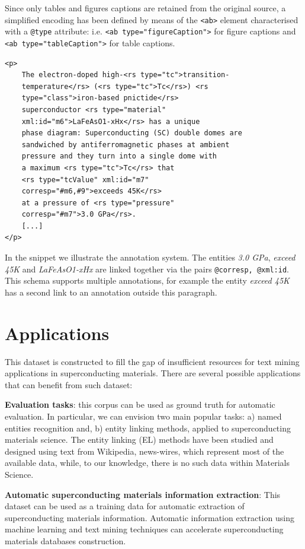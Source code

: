 \documentclass[fleqn,10pt]{wlscirep}
\begin{document}
Since only tables and figures captions are retained from the original source, a simplified encoding has been defined by means of the \texttt{<ab>} element characterised with a   \texttt{@type} attribute: i.e. \texttt{<ab type="figureCaption">} for figure captions and \texttt{<ab type="tableCaption">} for table captions.

\begin{verbatim}
<p>
    The electron-doped high-<rs type="tc">transition-
    temperature</rs> (<rs type="tc">Tc</rs>) <rs 
    type="class">iron-based pnictide</rs> 
    superconductor <rs type="material" 
    xml:id="m6">LaFeAsO1-xHx</rs> has a unique 
    phase diagram: Superconducting (SC) double domes are 
    sandwiched by antiferromagnetic phases at ambient 
    pressure and they turn into a single dome with 
    a maximum <rs type="tc">Tc</rs> that 
    <rs type="tcValue" xml:id="m7" 
    corresp="#m6,#9">exceeds 45K</rs> 
    at a pressure of <rs type="pressure" 
    corresp="#m7">3.0 GPa</rs>. 
    [...]
</p>
\end{verbatim}

In the snippet we illustrate the annotation system. The entities \textit{3.0 GPa}, \textit{exceed 45K} and \textit{LaFeAsO1-xHx} are linked together via the pairs \texttt{@corresp, @xml:id}. 
This schema supports multiple annotations, for example the entity \textit{exceed 45K} has a second link to an annotation outside this paragraph. 
\section*{Applications}
\label{sec:applications}
This dataset is constructed to fill the gap of insufficient resources for text mining applications in superconducting materials. There are several possible applications that can benefit from such dataset:

\textbf{Evaluation tasks}: this corpus can be used as ground truth for automatic evaluation. In particular, we can envision two main popular tasks: a) named entities recognition  and, b) entity linking methods, applied to superconducting materials science. 
The entity linking (EL) methods have been studied and designed using text from Wikipedia, news-wires, which represent most of the available data, while, to our knowledge, there is no such data within Materials Science.

\textbf{Automatic superconducting materials information extraction}: This dataset can be used as a training data for automatic extraction of superconducting materials information. Automatic information extraction using machine learning and text mining techniques can accelerate superconducting materials databases construction.
\end{document}
